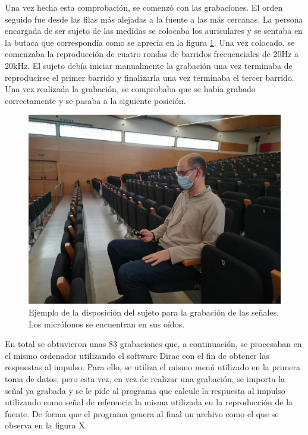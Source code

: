 \documentclass[11pt,a4paper,twoside]{book}
\begin{document}
            Una vez hecha esta comprobación, se comenzó con las grabaciones. El orden seguido fue desde las filas más alejadas a la fuente a las más cercanas. La persona encargada de ser sujeto de las medidas se colocaba los auriculares y se sentaba en la butaca que correspondía como se aprecia en la figura \ref{fig:Nico}. Una vez colocado, se comenzaba la reproducción de cuatro rondas de barridos frecuenciales de 20Hz a 20kHz. El sujeto debía iniciar manualmente la grabación una vez terminaba de reproducirse el primer barrido y finalizarla una vez terminaba el tercer barrido. Una vez realizada la grabación, se comprobaba que se había grabado correctamente y se pasaba a la siguiente posición. 
                
            \begin{figure}
                \includegraphics[scale=0.3]{../imagenes/Nico.jpg}
                \centering
                \caption{Ejemplo de la disposición del sujeto para la grabación de las señales. Los micrófonos se encuentran en sus oídos.}
                \label{fig:Nico}
            \end{figure}
                
            En total se obtuvieron unas 83 grabaciones que, a continuación, se procesaban en el mismo ordenador utilizando el software Dirac con el fin de obtener las respuestas al impulso. Para ello, se utiliza el mismo menú utilizado en la primera toma de datos, pero esta vez, en vez de realizar una grabación, se importa la señal ya grabada y se le pide al programa que calcule la respuesta al impulso utilizando como señal de referencia la misma utilizada en la reproducción de la fuente. De forma que el programa genera al final un archivo como el que se observa en la figura X.
            
\end{document}
